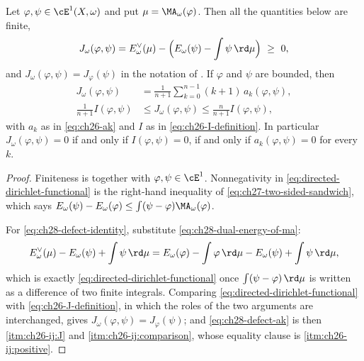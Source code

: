 \begin{proposition}
\label{prop:ch28-fenchel-defect}
Let \(\varphi,\psi\in\cE^1(X,\omega)\) and put
\(\mu=\MA_\omega(\varphi)\).  Then all the quantities below are finite,
\begin{equation}
\label{eq:ch28-defect-identity}
 J_\omega(\varphi,\psi)
 =E^\vee_\omega(\mu)-\Bigl(E_\omega(\psi)-\int\psi\,\rd\mu\Bigr)
 \ \geq\ 0 ,
\end{equation}
and \(J_\omega(\varphi,\psi)=J_\varphi(\psi)\) in the notation of
.  If \(\varphi\) and \(\psi\) are bounded, then
\begin{equation}
\label{eq:ch28-defect-ak}
 \begin{aligned}
 J_\omega(\varphi,\psi)
 &=\frac1{n+1}\sum_{k=0}^{n-1}(k+1)\,a_k(\varphi,\psi),\\
 \frac1{n+1}I(\varphi,\psi)
 &\leq J_\omega(\varphi,\psi)
 \leq\frac n{n+1}I(\varphi,\psi),
 \end{aligned}
\end{equation}
with \(a_k\) as in \eqref{eq:ch26-ak} and \(I\) as in
\eqref{eq:ch26-I-definition}.  In particular
\(J_\omega(\varphi,\psi)=0\) if and only if \(I(\varphi,\psi)=0\), if and
only if \(a_k(\varphi,\psi)=0\) for every \(k\).
\end{proposition}

\begin{proof}
Finiteness is  together with
\(\varphi,\psi\in\cE^1\).  Nonnegativity in
\eqref{eq:directed-dirichlet-functional} is the right-hand inequality of
\eqref{eq:ch27-two-sided-sandwich}, which says
\(E_\omega(\psi)-E_\omega(\varphi)\leq\int(\psi-\varphi)\MA_\omega(\varphi)\).

For \eqref{eq:ch28-defect-identity}, substitute
\eqref{eq:ch28-dual-energy-of-ma}:
\[
 E^\vee_\omega(\mu)-E_\omega(\psi)+\int\psi\,\rd\mu
 =E_\omega(\varphi)-\int\varphi\,\rd\mu-E_\omega(\psi)
  +\int\psi\,\rd\mu ,
\]
which is exactly \eqref{eq:directed-dirichlet-functional} once
\(\int(\psi-\varphi)\,\rd\mu\) is written as a difference of two finite
integrals.  Comparing \eqref{eq:directed-dirichlet-functional} with
\eqref{eq:ch26-J-definition}, in which the roles of the two arguments are
interchanged, gives \(J_\omega(\varphi,\psi)=J_\varphi(\psi)\); and
\eqref{eq:ch28-defect-ak} is then
\,\cref{itm:ch26-ij:J} and
\cref{itm:ch26-ij:comparison}, whose equality clause is
\cref{itm:ch26-ij:positive}.
\end{proof}

